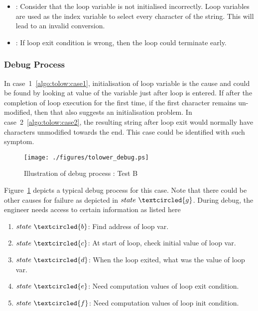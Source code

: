 \begin{itemize}

\item [Case 1]: Consider that the loop variable is not initialised incorrectly. Loop variables are used as the index variable to select every character of the string. This will lead to an invalid conversion. \label{algo:tolow:case1}

\item [Case 2]: If loop exit condition is wrong, then the loop could terminate early. \label{algo:tolow:case2}
\end{itemize}

\subsubsection{Debug Process}

In case~1~\ref{algo:tolow:case1}, initialisation of loop variable is the cause and could be found by looking at value of the variable just after loop is entered. If after the completion of loop execution for the first time, if the first character remains un-modified, then that also suggests an initialisation problem.
In case~2~\ref{algo:tolow:case2}, the resulting string after loop exit would normally have characters unmodified towards the end. This case could be identified with such symptom.

\begin{figure}[h]
\centering
\texttt{[image: ./figures/tolower\_debug.ps]}
\caption{Illustration of debug process : Test B} 
\label{fig:tolower_debug.ps}
\end{figure}

Figure~\ref{fig:tolower_debug.ps} depicts a typical debug process for this case. Note that there could be other causes for failure as depicted in $state~\textcircled{g}$. During debug, the engineer needs access to certain information as listed here

\begin{enumerate}
\item $state~\textcircled{b}$: Find address of loop var.
\item $state~\textcircled{c}$: At start of loop, check initial value of loop var.
\item $state~\textcircled{d}$: When the loop exited, what was the value of loop var.
\item $state~\textcircled{e}$: Need computation values of loop exit condition.
\item $state~\textcircled{f}$: Need computation values of loop init condition.
\end{enumerate}

